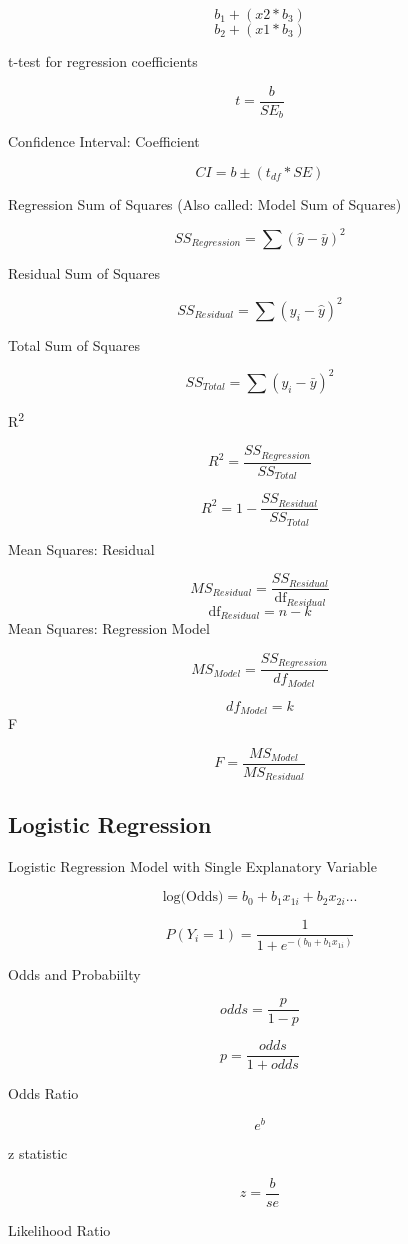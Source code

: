 \documentclass[
]{article}
\begin{document}
\[b_{1} + (x2 * b_{3})\] \[b_{2} + (x1 * b_{3})\]

t-test for regression coefficients

\[t = \frac{b}{SE_{b}}\]

Confidence Interval: Coefficient

\[CI = b \pm (t_{df} * SE)\]

Regression Sum of Squares (Also called: Model Sum of Squares)

\[SS_{Regression} = \sum(\hat{y} - \bar{y})^2\]

Residual Sum of Squares

\[SS_{Residual} = \sum(y_{i} - \hat{y})^2\]

Total Sum of Squares

\[SS_{Total} = \sum(y_{i} - \bar{y})^2\]

R\textsuperscript{2}

\[R^2 = \frac{SS_{Regression}}{SS_{Total}}\]

\[R^2 = 1 - \frac{SS_{Residual}}{SS_{Total}} \]

Mean Squares: Residual

\[MS_{Residual} = \frac{SS_{Residual}}{\textrm{df}_{Residual}}\]
\[\textrm{df}_{Residual} = n-k\] Mean Squares: Regression Model

\[MS_{Model} = \frac{SS_{Regression}}{df_{Model}}\]

\[df_{Model} = k\] F

\[F = \frac{MS_{Model}}{MS_{Residual}}\]

\subsection{Logistic Regression}\label{logistic-regression}

Logistic Regression Model with Single Explanatory Variable

\[\textrm{log(Odds)} = b_0 + b_1x_{1i} + b_2x_{2i}...\]

\[P(Y_{i} = 1) = \frac{1}{1 + e^{-(b_{0} + b_{1}x_{1i})}}\]

Odds and Probabiilty

\[odds = \frac{p}{1 - p}\]

\[p = \frac{odds}{1 + odds}\]

Odds Ratio

\[e^{b}\]

z statistic

\[z = \frac{b}{se}\]

Likelihood Ratio
\end{document}
